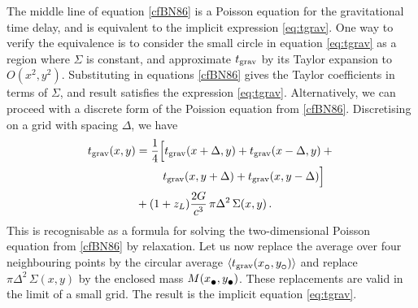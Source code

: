 \documentclass[usenatbib]{mn2e}
\newcommand{\tgrav}{t_{\rm grav}}
\newcommand{\subcirc}{{\lower.33ex\hbox{$\circ$}}}
\newcommand{\subbullet}{{\lower.33ex\hbox{$\bullet$}}}
\begin{document}
The middle line of equation \eqref{cfBN86} is a Poisson equation for
the gravitational time delay, and is equivalent to the implicit
expression \eqref{eq:tgrav}.  One way to verify the equivalence is to
consider the small circle in equation \eqref{eq:tgrav} as a region
where $\Sigma$ is constant, and approximate $\tgrav$ by its Taylor
expansion to $O(x^2,y^2)$.  Substituting in equations \eqref{cfBN86}
gives the Taylor coefficients in terms of $\Sigma$, and result
satisfies the expression \eqref{eq:tgrav}.  Alternatively, we can
proceed with a discrete form of the Poission equation from
\eqref{cfBN86}.  Discretising on a grid with spacing $\Delta$, we have
\begin{equation} \label{eq:relax}
\begin{aligned}
\tgrav(x,y) &=
\frac14 \Big[ \tgrav(x+\Delta,y) + \tgrav(x-\Delta,y) + {}\\
&\kern24pt    \tgrav(x,y+\Delta) + \tgrav(x,y-\Delta) \Big] \\
&+ (1+z_L)\frac{2G}{c^3} \, \pi\Delta^2 \, \Sigma(x,y) \,.
\end{aligned}
\end{equation}
This is recognisable as a formula for solving the two-dimensional
Poisson equation from \eqref{cfBN86} by relaxation.  Let us now
replace the average over four neighbouring points by the circular
average $\left\langle \tgrav(x_\subcirc,y_\subcirc) \right\rangle$ and
replace $\pi\Delta^2\,\Sigma(x,y)$ by the enclosed mass
$M(x_\subbullet,y_\subbullet)$.  These replacements are valid in the
limit of a small grid.  The result is the implicit
equation \eqref{eq:tgrav}.






\end{document}

